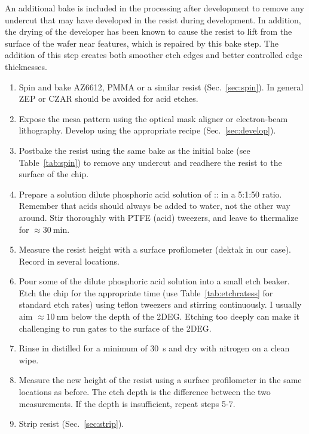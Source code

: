 An additional bake is included in the processing after development to remove any undercut that may have developed in the resist during development.
In addition, the drying of the developer has been known to cause the resist to lift from the surface of the wafer near features, which is repaired
by this bake step. The addition of this step creates both smoother etch edges and better controlled edge thicknesses.

\begin{enumerate}
    \item Spin and bake AZ6612, PMMA or a similar resist (Sec.~\ref{sec:spin}). In general ZEP or CZAR should be avoided for acid etches.
    \item Expose the mesa pattern using the optical mask aligner or electron-beam lithography. Develop using the appropriate recipe (Sec.~\ref{sec:develop}).
    \item Postbake the resist using the same bake as the initial bake (see Table~\ref{tab:spin}) to remove any undercut and readhere the resist to the surface of the chip.
    \item Prepare a solution dilute phosphoric acid solution of :: in a 5:1:50 ratio. Remember that acids should always be added to water, not the other way around. Stir thoroughly with PTFE (acid) tweezers, and leave to thermalize for $\approx \SI{30}{\minute}$.
    \item Measure the resist height with a surface profilometer (dektak in our case). Record in several locations.
    \item Pour some of the dilute phosphoric acid solution into a small etch beaker. Etch the chip for the appropriate time (use Table~\ref{tab:etchratess} for standard etch rates) using teflon tweezers and stirring continuously. I usually aim $\approx \SI{10}{\nano\meter}$ below the depth of the 2DEG. Etching too deeply can make it challenging to run gates to the surface of the 2DEG.
    \item Rinse in distilled  for a minimum of \SI{30}{\second} and dry with nitrogen on a clean wipe.
    \item Measure the new height of the resist using a surface profilometer in the same locations as before. The etch depth is the difference between the two measurements. If the depth is insufficient, repeat steps 5-7.
    \item Strip resist (Sec.~\ref{sec:strip}).
\end{enumerate}

